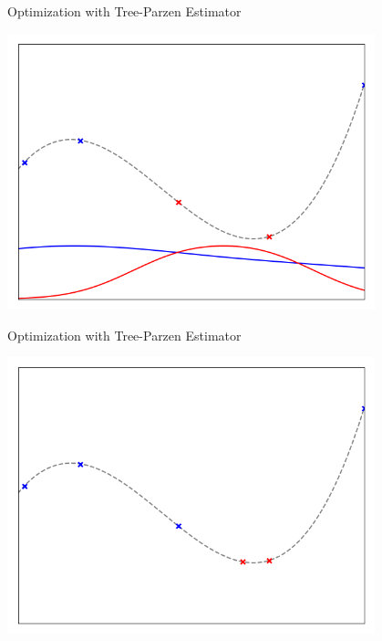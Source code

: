 \begin{frame}[c,fragile]{Optimization with Tree-Parzen Estimator }

\centering
\includegraphics[width=0.8\textwidth]{images/tpeiter_1_pdfs.png}


\end{frame}
\begin{frame}[c,fragile]{Optimization with Tree-Parzen Estimator }

\centering
\includegraphics[width=0.8\textwidth]{images/tpeiter_2_observations.png}


\end{frame}
